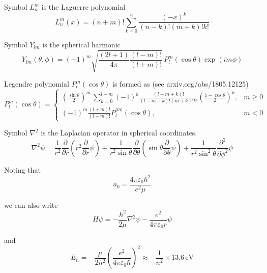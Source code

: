Symbol $L_n^m$ is the Laguerre polynomial
\begin{equation*}
L_n^m(x)=(n+m)!\sum_{k=0}^n
\frac{(-x)^k}{(n-k)!(m+k)!k!}
\end{equation*}

Symbol $Y_{lm}$ is the spherical harmonic
\begin{equation*}
Y_{lm}(\theta,\phi)=(-1)^m
\sqrt{\frac{(2l+1)}{4\pi}
\frac{(l-m)!}{(l+m)!}}\,
P_l^m(\cos\theta)\exp(im\phi)
\end{equation*}

Legendre polynomial $P_l^m(\cos\theta)$ is formed as (see arxiv.org/abs/1805.12125)
\begin{equation*}
P_l^m(\cos\theta)=\begin{cases}
\displaystyle
\left(\frac{\sin\theta}{2}\right)^m\,\sum_{k=0}^{l-m}
(-1)^k\frac{(l+m+k)!}{(l-m-k)!(m+k)!k!}
\left(\frac{1-\cos\theta}{2}\right)^k, & m\ge0
\\[4ex]
\displaystyle
(-1)^m\frac{(l+m)!}{(l-m)!}P_l^{|m|}(\cos\theta), & m<0
\end{cases}
\end{equation*}

Symbol $\nabla^2$ is the Laplacian operator in spherical coordinates.
\begin{equation*}
\nabla^2\psi=\frac{1}{r^2}\frac{\partial}{\partial r}
\left(r^2\frac{\partial}{\partial r}\psi\right)
+
\frac{1}{r^2\sin\theta}\frac{\partial}{\partial\theta}
\left(\sin\theta\frac{\partial}{\partial\theta}\psi\right)
+
\frac{1}{r^2\sin^2\theta}\frac{\partial^2}{\partial\phi^2}\psi
\end{equation*}

Noting that
\begin{equation*}
a_0=\frac{4\pi\varepsilon_0\hbar^2}{e^2\mu}
\end{equation*}

we can also write
\begin{equation*}
H\psi=-\frac{\hbar^2}{2\mu}\nabla^2\psi-\frac{e^2}{4\pi\varepsilon_0 r}\psi
\end{equation*}

and
\begin{equation*}
E_n=-\frac{\mu}{2n^2}\left(\frac{e^2}{4\pi\varepsilon_0\hbar}\right)^2
\approx-\frac{1}{n^2}\times13.6\,\text{eV}
\end{equation*}


